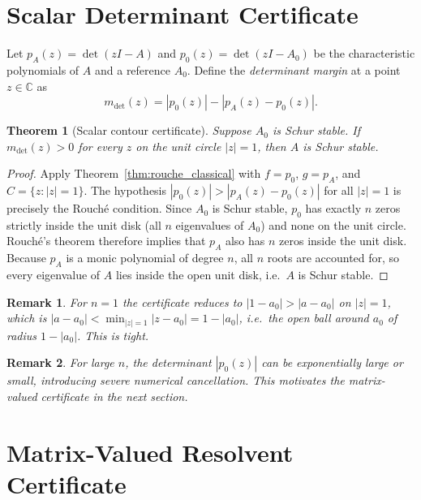\documentclass{article}
\newtheorem{theorem}{Theorem}
\newtheorem{remark}{Remark}
\theoremstyle{definition}
\newcommand{\C}{\mathbb{C}}
\newcommand{\abs}[1]{\left|#1\right|}
\begin{document}
\section{Scalar Determinant Certificate}
\label{sec:det}

Let $p_A(z) = \det(zI - A)$ and $p_0(z) = \det(zI - A_0)$ be the
characteristic polynomials of $A$ and a reference $A_0$.  Define the
\emph{determinant margin} at a point $z \in \C$ as
\[
  m_{\det}(z) = \abs{p_0(z)} - \abs{p_A(z) - p_0(z)}.
\]

\begin{theorem}[Scalar contour certificate]
\label{thm:det}
Suppose $A_0$ is Schur stable.  If $m_{\det}(z) > 0$ for every $z$ on the
unit circle $|z| = 1$, then $A$ is Schur stable.
\end{theorem}

\begin{proof}
Apply Theorem~\ref{thm:rouche_classical} with $f = p_0$, $g = p_A$, and
$C = \{z : |z| = 1\}$.  The hypothesis $\abs{p_0(z)} > \abs{p_A(z) - p_0(z)}$
for all $|z| = 1$ is precisely the Rouch\'e condition.  Since $A_0$ is Schur
stable, $p_0$ has exactly $n$ zeros strictly inside the unit disk (all $n$
eigenvalues of $A_0$) and none on the unit circle.  Rouch\'e's theorem
therefore implies that $p_A$ also has $n$ zeros inside the unit disk.
Because $p_A$ is a monic polynomial of degree $n$, all $n$ roots are
accounted for, so every eigenvalue of $A$ lies inside the open unit disk,
i.e.\ $A$ is Schur stable.
\end{proof}

\begin{remark}
For $n = 1$ the certificate reduces to $\abs{1 - a_0} > \abs{a - a_0}$ on
$|z| = 1$, which is $|a - a_0| < \min_{|z|=1}|z - a_0| = 1 - |a_0|$, i.e.\
the open ball around $a_0$ of radius $1 - |a_0|$.  This is tight.
\end{remark}

\begin{remark}
For large $n$, the determinant $\abs{p_0(z)}$ can be exponentially large or
small, introducing severe numerical cancellation.  This motivates the
matrix-valued certificate in the next section.
\end{remark}

\section{Matrix-Valued Resolvent Certificate}
\label{sec:res}
\end{document}

